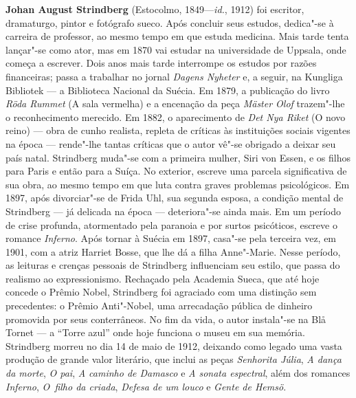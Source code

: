 \textbf{Johan August Strindberg} (Estocolmo, 1849---\textit{id.}, 1912) 
foi escritor, dramaturgo, pintor e fotógrafo sueco. Após concluir
seus estudos, dedica"-se à carreira de professor, ao mesmo tempo em que
estuda medicina. Mais tarde tenta lançar"-se como ator, mas em 1870 vai
estudar na universidade de Uppsala, onde começa a escrever. Dois anos
mais tarde interrompe os estudos por razões financeiras; passa a
trabalhar no jornal \textit{Dagens Nyheter} e, a seguir, na
Kungliga Bibliotek --- a Biblioteca Nacional da Suécia.
Em 1879, a publicação do livro \textit{Röda Rummet} (A sala vermelha) e
a encenação da peça \textit{Mäster Olof} trazem"-lhe o reconhecimento
merecido. Em 1882, o aparecimento de \textit{Det Nya Riket} (O novo
reino) --- obra de cunho realista, repleta de críticas às instituições
sociais vigentes na época --- rende"-lhe tantas críticas que o autor vê"-se
obrigado a deixar seu país natal. Strindberg muda"-se com a primeira
mulher, Siri von Essen, e os filhos para Paris e então para a Suíça. No
exterior, escreve uma parcela significativa de sua obra, ao mesmo tempo
em que luta contra graves problemas psicológicos. Em 1897, após
divorciar"-se de Frida Uhl, sua segunda esposa, a condição mental de
Strindberg --- já delicada na época --- deteriora"-se ainda mais. Em um
período de crise profunda, atormentado pela paranoia e por surtos
psicóticos, escreve o romance \textit{Inferno}. Após tornar à Suécia em
1897, casa"-se pela terceira vez, em 1901, com a atriz Harriet Bosse,
que lhe dá a filha Anne"-Marie. Nesse período, as leituras e crenças
pessoais de Strindberg influenciam seu estilo, que passa do realismo ao
expressionismo. Rechaçado pela Academia Sueca, que até 
hoje concede o Prêmio Nobel, Strindberg foi agraciado com uma 
distinção sem precedentes: o Prêmio Anti"-Nobel, uma arrecadação 
pública de dinheiro promovida por seus conterrâneos. 
No fim da vida, o autor instala"-se na Blå Tornet --- a “Torre azul” 
onde hoje funciona o museu em sua memória.
Strindberg morreu no dia 14 de maio de 1912, deixando como legado uma
vasta produção de grande valor literário, que inclui as peças
\textit{Senhorita Júlia}, \textit{A dança da morte}, \textit{O pai},
\textit{A caminho de Damasco} e \textit{A sonata espectral}, além dos
romances \textit{Inferno}, \textit{O~filho da criada}, \textit{Defesa
de um louco} e \textit{Gente de Hemsö}. 

